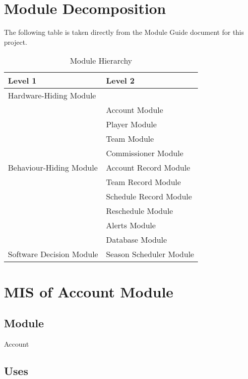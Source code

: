 \documentclass[12pt, titlepage]{article}
\begin{document}
\section{Module Decomposition}

The following table is taken directly from the Module Guide document for this project.

\begin{table}[h!]
\centering
\begin{tabular}{p{} p{}}
\toprule
\textbf{Level 1} & \textbf{Level 2}\\
\midrule

{Hardware-Hiding Module} & ~ \\
\midrule

\multirow{9}{0.3\textwidth}{Behaviour-Hiding Module} & Account Module\\
& Player Module\\
& Team Module\\
& Commissioner Module\\
& Account Record Module\\
& Team Record Module\\
& Schedule Record Module\\
& Reschedule Module\\
& Alerts Module\\
& Database Module\\
\midrule

\multirow{1}{0.3\textwidth}{Software Decision Module} & Season Scheduler
Module\\
\bottomrule

\end{tabular}
\caption{Module Hierarchy}
\label{TblMH}
\end{table}

\newpage

\section{MIS of Account Module} \label{mAC}

\subsection{Module}

Account

\subsection{Uses}
\end{document}
